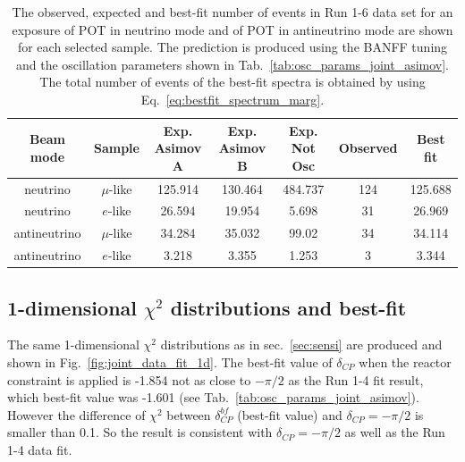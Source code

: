 \begin{table}[htb]
\centering
\begin{tabular}{| c | c | c | c | c | c | c |}
\hline
Beam mode	& Sample		& Exp. Asimov A  	& Exp. Asimov B	& Exp. Not Osc			& Observed 	& Best fit\\
\hline
neutrino	 	& $\mu$-like 	& 125.914			& 130.464 		& 484.737				& 124 		& 125.688 \\
neutrino 		& $e$-like  	& 26.594			& 19.954			& 5.698				& 31 			& 26.969 \\
antineutrino 	& $\mu$-like 	& 34.284			& 35.032			& 99.02				& 34 			& 34.114 \\
antineutrino 	& $e$-like 	& 3.218			& 3.355			& 1.253				& 3 			& 3.344 \\
\hline
\end{tabular}
\caption{
The observed, expected and best-fit number of events in Run 1-6 data set
for an exposure
of \TotalPotNu POT in neutrino mode
and
of \TotalPotNuBar POT in antineutrino mode
are shown 
for each selected sample.
The prediction is produced using the BANFF tuning
and the oscillation parameters shown in Tab.~\ref{tab:osc_params_joint_asimov}.
The total number of events of the best-fit spectra is obtained by using Eq.~\ref{eq:bestfit_spectrum_marg}.
}
\label{tab:num_events}
\end{table}


%
%

\subsection {1-dimensional $\chi^2$ distributions and best-fit}
\label{sec:chisq_1d}



The same 1-dimensional $\chi^2$ distributions as in sec.~\ref{sec:sensi} are produced
and shown in Fig.~\ref{fig:joint_data_fit_1d}.
The best-fit value of $\delta_{CP}$ when the reactor constraint is applied is -1.854
not as close to $-\pi/2$ as the Run 1-4 fit result, which best-fit value was -1.601 (see Tab.~\ref{tab:osc_params_joint_asimov}).
However the difference of $\chi^2$ between $\delta_{CP}^{bf}$ (best-fit value) and $\delta_{CP}=-\pi/2$ is smaller than 0.1.
So the result is consistent with $\delta_{CP} = -\pi/2$ as well as the Run 1-4 data fit.
 

